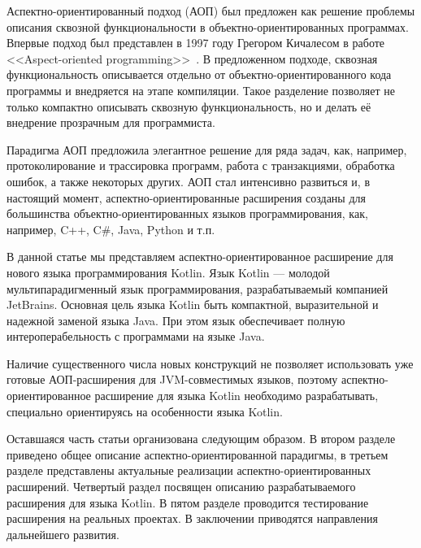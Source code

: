 \documentclass[conference]{IEEEtran}
\begin{document}
Аспектно-ориентированный подход (АОП) был предложен как решение проблемы
описания сквозной функциональности в объектно-ориентированных программах.
Впервые подход был представлен в 1997 году Грегором Кичалесом в работе
<<Aspect-oriented programming>>~\cite{kiczales_aop}.
В предложенном подходе, сквозная функциональность описывается отдельно от
объектно-ориентированного кода программы и внедряется на этапе компиляции.
Такое разделение позволяет не только компактно описывать сквозную 
функциональность, но и делать её внедрение прозрачным для программиста.

Парадигма АОП предложила элегантное решение для ряда задач, как, например, 
протоколирование и трассировка программ, работа с транзакциями, обработка
ошибок, а также некоторых других.
АОП стал интенсивно развиться и, в настоящий момент, аспектно-ориентированные
расширения созданы для большинства объектно-ориентированных языков
программирования, как, например, C++, C\#, Java, Python и т.п.

В данной статье мы представляем аспектно-ориентированное расширение для нового 
языка программирования Kotlin.
Язык Kotlin --- молодой мультипарадигменный язык программирования,
разрабатываемый компанией JetBrains.
Основная цель языка Kotlin быть компактной, выразительной и надежной заменой
языка Java.
При этом язык обеспечивает полную интероперабельность с программами на языке
Java.

Наличие существенного числа новых конструкций не позволяет использовать уже 
готовые АОП-расширения для JVM-совместимых языков, поэтому
аспектно-ориентированное  расширение для языка Kotlin необходимо разрабатывать,
специально ориентируясь на особенности языка Kotlin. 

Оставшаяся часть статьи организована следующим образом. 
В втором разделе приведено общее описание аспектно-ориентированной парадигмы, 
в третьем разделе представлены актуальные реализации аспектно-ориентированных 
расширений.
Четвертый раздел посвящен описанию разрабатываемого расширения для языка Kotlin.
В пятом разделе проводится тестирование расширения на реальных проектах.
В заключении приводятся направления дальнейшего развития. 

\end{document}
